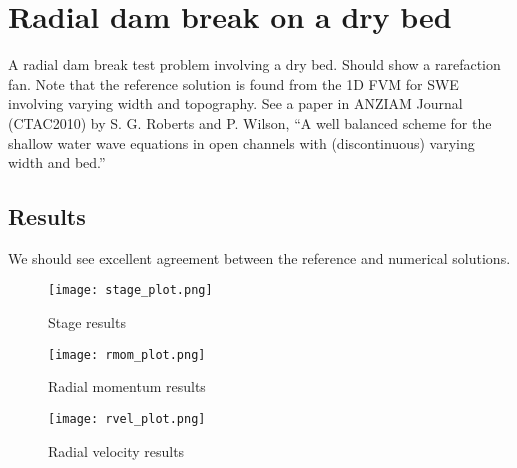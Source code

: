 
\section{Radial dam break on a dry bed}

A radial dam break test problem involving a dry bed. Should show a rarefaction fan. Note that the reference solution is found from the 1D FVM for SWE involving varying width and topography. See a paper in ANZIAM Journal (CTAC2010) by S. G. Roberts and P. Wilson, ``A well balanced scheme for the shallow water wave equations in open channels with (discontinuous) varying width and bed.''


\subsection{Results}

We should see excellent agreement between the reference and numerical solutions.

\begin{figure}[h]
\begin{center}
\texttt{[image: stage\_plot.png]}
\end{center}
\caption{Stage results}
\end{figure}


\begin{figure}[h]
\begin{center}
\texttt{[image: rmom\_plot.png]}
\end{center}
\caption{Radial momentum results}
\end{figure}


\begin{figure}[h]
\begin{center}
\texttt{[image: rvel\_plot.png]}
\end{center}
\caption{Radial velocity results}
\end{figure}


\endinput
